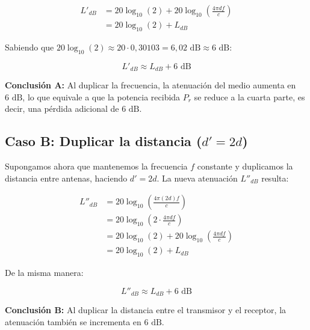 \documentclass[11pt,a4paper]{article}
\begin{document}
\begin{enumerate}[label=4.\arabic*), itemsep=0.3cm]
        \begin{align*}
          L'_{dB} & = 20 \log_{10}(2) + 20 \log_{10} \left( \frac{4\pi d f}{c} \right) \\[0.5em]
                  & = 20 \log_{10}(2) + L_{dB}
        \end{align*}

        Sabiendo que $20 \log_{10}(2) \approx 20 \cdot 0,30103 = 6,02\text{ dB} \approx 6\text{ dB}$:

        \begin{equation}
          L'_{dB} \approx L_{dB} + 6\text{ dB}
        \end{equation}

        \textbf{Conclusión A:} Al duplicar la frecuencia, la atenuación del medio aumenta en $6\text{ dB}$, lo que equivale a que la potencia recibida $P_r$ se reduce a la cuarta parte, es decir, una pérdida adicional de $6\text{ dB}$.

        \subsection*{Caso B: Duplicar la distancia ($d' = 2d$)}

        Supongamos ahora que mantenemos la frecuencia $f$ constante y duplicamos la distancia entre antenas, haciendo $d' = 2d$. La nueva atenuación $L''_{dB}$ resulta:

        \begin{align*}
          L''_{dB} & = 20 \log_{10} \left( \frac{4\pi (2d) f}{c} \right)                \\[0.5em]
                   & = 20 \log_{10} \left( 2 \cdot \frac{4\pi d f}{c} \right)           \\[0.5em]
                   & = 20 \log_{10}(2) + 20 \log_{10} \left( \frac{4\pi d f}{c} \right) \\[0.5em]
                   & = 20 \log_{10}(2) + L_{dB}
        \end{align*}

        De la misma manera:

        \begin{equation}
          L''_{dB} \approx L_{dB} + 6\text{ dB}
        \end{equation}

        \textbf{Conclusión B:} Al duplicar la distancia entre el transmisor y el receptor, la atenuación también se incrementa en $6\text{ dB}$.


\end{enumerate}
\end{document}

